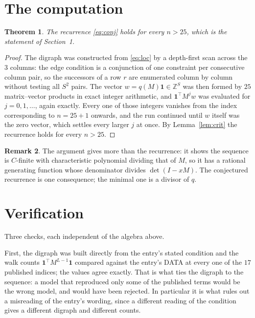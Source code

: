 \documentclass[11pt,a4paper]{article}
\theoremstyle{plain}
\newtheorem{theorem}{Theorem}
\theoremstyle{definition}
\newtheorem{remark}[theorem]{Remark}
\begin{document}
\section{The computation}

\begin{theorem}
The recurrence \eqref{eq:conj} holds for every $n>25$, which is the statement of
Section~1.
\end{theorem}

\begin{proof}
The digraph was constructed from \eqref{eq:loc} by a depth-first scan across the $3$
columns: the edge condition is a conjunction of one constraint per consecutive column
pair, so the successors of a row $r$ are enumerated column by column without testing all
$S^2$ pairs. The vector $w=q(M)\mathbf{1}\in\mathbb{Z}^{S}$ was then formed by $25$
matrix--vector products in exact integer arithmetic, and $\mathbf{1}^{\!\top}M^{j}w$ was
evaluated for $j=0,1,\dots$, again exactly. Every one of those integers vanishes from the
index corresponding to $n=25+1$ onwards, and the run continued until $w$ itself was the
zero vector, which settles every larger $j$ at once. By Lemma~\ref{lem:crit} the recurrence
holds for every $n>25$.
\end{proof}

\begin{remark}
The argument gives more than the recurrence: it shows the sequence is $C$-finite with
characteristic polynomial dividing that of $M$, so it has a rational generating function
whose denominator divides $\det(I-xM)$. The conjectured recurrence is one consequence; the
minimal one is a divisor of $q$.
\end{remark}

\section{Verification}

Three checks, each independent of the algebra above.

First, the digraph was built directly from the entry's stated condition and the walk counts
$\mathbf{1}^{\!\top}M^{L-1}\mathbf{1}$ compared against the entry's DATA at
every one of the $17$ published indices; the values agree exactly. That is what ties
the digraph to the sequence: a model that reproduced only some of the published terms would
be the wrong model, and would have been rejected. In particular it is what rules out a
misreading of the entry's wording, since a different reading of the condition gives a
different digraph and different counts.
\end{document}

